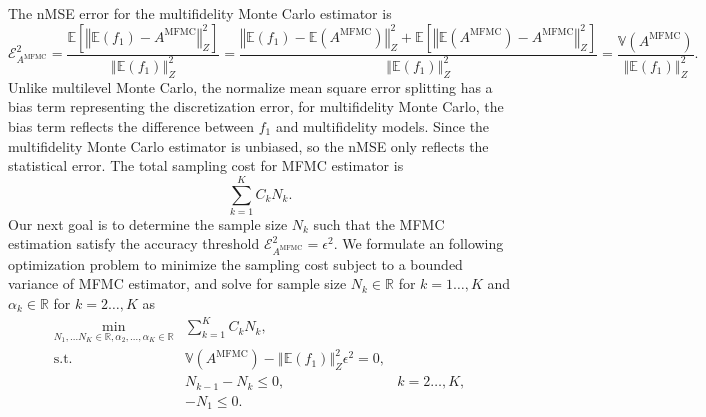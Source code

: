\documentclass[final,3p,times,11pt]{elsarticle}
\begin{document}
The nMSE error for the multifidelity Monte Carlo estimator is
\[
\mathcal{E}_{A^{\text{MFMC}}}^2=\frac{\mathbb E\left[\left\Vert\mathbb{E}(f_1)-A^{\text{MFMC}} \right\Vert_{Z}^2\right]}{\left\Vert\mathbb{E}(f_1) \right\Vert_{Z}^2} = \frac{\left\Vert\mathbb{E}(f_1)-\mathbb{E}(A^{\text{MFMC}}) \right\Vert_{Z}^2+\mathbb E\left[\left\Vert\mathbb{E}(A^{\text{MFMC}})-A^{\text{MFMC}} \right\Vert_{Z}^2\right]}{\left\Vert\mathbb{E}(f_1) \right\Vert_{Z}^2} = \frac{\mathbb{V}\left(A^{\text{MFMC}}\right)}{\left\Vert\mathbb{E}(f_1) \right\Vert_{Z}^2}.
\]
Unlike multilevel Monte Carlo, the normalize mean square error splitting has a bias term representing the discretization error, for multifidelity Monte Carlo, the bias term reflects the difference between $f_1$ and multifidelity models. Since the multifidelity Monte Carlo estimator is unbiased, so the nMSE only reflects the statistical error. The total sampling cost for MFMC estimator is 
\[
\sum_{k=1}^K C_kN_k.
\]
Our next goal is to determine the sample size $N_k$ such that the MFMC estimation satisfy the accuracy threshold $\mathcal{E}_{A^{\text{MFMC}}}^2= \epsilon^2$. We formulate an following optimization problem to minimize the sampling cost subject to a bounded variance of MFMC estimator, and solve for sample size $N_k\in \mathbb{R}$ for $k=1\dots, K$ and $\alpha_k\in \mathbb{R}$ for $k=2\dots, K$ as
\begin{equation}\label{eq:Optimization_pb_sample_size}
    \begin{array}{lll}
    \displaystyle\min_{N_1,\ldots N_K\in \mathbb{R}, \alpha_2,\ldots,\alpha_K\in \mathbb{R}} &\sum_{k=1}^K C_kN_k,\\
       \text{s.t.} &\mathbb{V}\left(A^{\text{MFMC}}\right)- \left\Vert\mathbb{E}(f_1) \right\Vert_{Z}^2\epsilon^2 = 0,\\
        &\displaystyle N_{k-1}-N_k\le 0, &k=2\ldots,K,\\
        &\displaystyle -N_1\le 0. \\%
    \end{array}
\end{equation}
\end{document}
